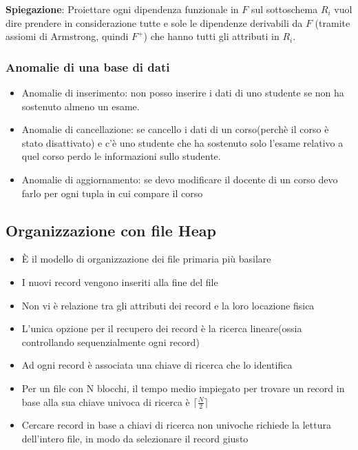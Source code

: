 \documentclass{article}
\begin{document}
\textbf{Spiegazione}: Proiettare ogni dipendenza funzionale in $F$ sul sottoschema $R_i$ vuol dire prendere in considerazione tutte e sole le dipendenze derivabili da $F$ (tramite assiomi di Armstrong, quindi $F^+$) che hanno tutti gli attributi in $R_i$.

\subsubsection{Anomalie di una base di dati}
\begin{itemize}
  \item Anomalie di inserimento: non posso inserire i dati di uno studente se non ha sostenuto almeno un esame.
  \item Anomalie di cancellazione: se cancello i dati di un corso(perchè il corso è stato disattivato) e c'è uno studente che ha sostenuto solo l'esame relativo a quel corso perdo le informazioni sullo studente.
  \item Anomalie di aggiornamento: se devo modificare il docente di un corso devo farlo per ogni tupla in cui compare il corso
\end{itemize}


\subsection{Organizzazione con file Heap}
\begin{itemize}
  \item È il modello di organizzazione dei file primaria più basilare
  \item I nuovi record vengono inseriti alla fine del file
  \item Non vi è relazione tra gli attributi dei record e la loro locazione fisica
  \item L'unica opzione per il recupero dei record è la ricerca lineare(ossia controllando sequenzialmente ogni record)
  \item Ad ogni record è associata una chiave di ricerca che lo identifica
  \item Per un file con N blocchi, il tempo medio impiegato per trovare un record
  in base alla sua chiave univoca di ricerca è $\lceil \frac{N}{2} \rceil$
  \item Cercare record in base a chiavi di ricerca non univoche richiede la lettura dell'intero file, in modo da selezionare il record giusto
\end{itemize}
\end{document}
